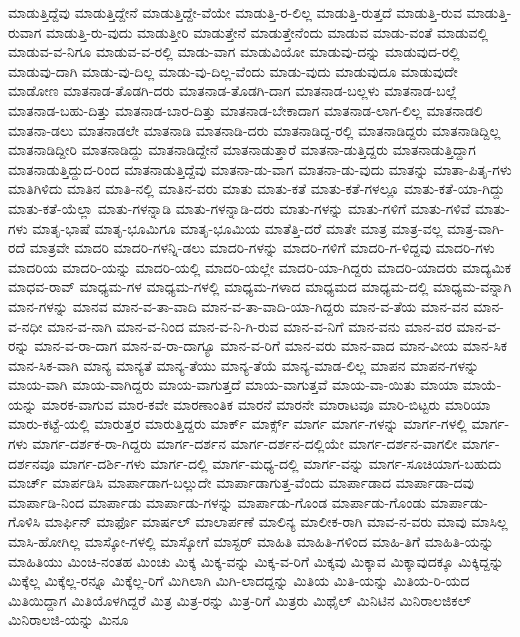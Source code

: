 {ಮಾಡುತ್ತಿದ್ದೆವು
ಮಾಡುತ್ತಿದ್ದೇನೆ
ಮಾಡುತ್ತಿದ್ದೇ-ವೆಯೇ
ಮಾಡುತ್ತಿ-ರ-ಲಿಲ್ಲ
ಮಾಡುತ್ತಿ-ರುತ್ತದೆ
ಮಾಡುತ್ತಿ-ರುವ
ಮಾಡುತ್ತಿ-ರುವಾಗ
ಮಾಡುತ್ತಿ-ರು-ವುದು
ಮಾಡುತ್ತೀರಿ
ಮಾಡುತ್ತೇನೆ
ಮಾಡುತ್ತೇನೆಂದು
ಮಾಡುವ
ಮಾಡು-ವಂತೆ
ಮಾಡುವಲ್ಲಿ
ಮಾಡುವ-ವ-ನಿಗೂ
ಮಾಡುವ-ವ-ರಲ್ಲಿ
ಮಾಡು-ವಾಗ
ಮಾಡುವಿಯೋ
ಮಾಡುವು-ದನ್ನು
ಮಾಡುವುದ-ರಲ್ಲಿ
ಮಾಡುವು-ದಾಗಿ
ಮಾಡು-ವು-ದಿಲ್ಲ
ಮಾಡು-ವು-ದಿಲ್ಲ-ವೆಂದು
ಮಾಡು-ವುದು
ಮಾಡುವುದೂ
ಮಾಡುವುದೇ
ಮಾಡೋಣ
ಮಾತನಾಡ-ತೊಡಗಿ-ದರು
ಮಾತನಾಡ-ತೊಡಗಿ-ದಾಗ
ಮಾತನಾಡ-ಬಲ್ಲಳು
ಮಾತನಾಡ-ಬಲ್ಲೆ
ಮಾತನಾಡ-ಬಹು-ದಿತ್ತು
ಮಾತನಾಡ-ಬಾರ-ದಿತ್ತು
ಮಾತನಾಡ-ಬೇಕಾದಾಗ
ಮಾತನಾಡ-ಲಾಗ-ಲಿಲ್ಲ
ಮಾತನಾಡಲಿ
ಮಾತನಾ-ಡಲು
ಮಾತನಾಡಲೇ
ಮಾತನಾಡಿ
ಮಾತನಾಡಿ-ದರು
ಮಾತನಾಡಿದ್ದ-ರಲ್ಲಿ
ಮಾತನಾಡಿದ್ದರು
ಮಾತನಾಡಿದ್ದಿಲ್ಲ
ಮಾತನಾಡಿದ್ದೀರಿ
ಮಾತನಾಡಿದ್ದು
ಮಾತನಾಡಿದ್ದೇನೆ
ಮಾತನಾಡುತ್ತಾರೆ
ಮಾತನಾ-ಡುತ್ತಿದ್ದರು
ಮಾತನಾಡುತ್ತಿದ್ದಾಗ
ಮಾತನಾಡುತ್ತಿದ್ದುದ-ರಿಂದ
ಮಾತನಾಡುತ್ತಿದ್ದೆವು
ಮಾತನಾ-ಡು-ವಾಗ
ಮಾತನಾ-ಡು-ವುದು
ಮಾತನ್ನು
ಮಾತಾ-ಪಿತೃ-ಗಳು
ಮಾತಿಗಿಳಿದು
ಮಾತಿನ
ಮಾತಿ-ನಲ್ಲಿ
ಮಾತಿನ-ವರು
ಮಾತು
ಮಾತು-ಕತೆ
ಮಾತು-ಕತೆ-ಗಳಲ್ಲೂ
ಮಾತು-ಕತೆ-ಯಾ-ಗಿದ್ದು
ಮಾತು-ಕತೆ-ಯೆಲ್ಲಾ
ಮಾತು-ಗಳನ್ನಾಡಿ
ಮಾತು-ಗಳನ್ನಾಡಿ-ದರು
ಮಾತು-ಗಳನ್ನು
ಮಾತು-ಗಳಿಗೆ
ಮಾತು-ಗಳಿವೆ
ಮಾತು-ಗಳು
ಮಾತೃ-ಭಾಷೆ
ಮಾತೃ-ಭೂಮಿಗೂ
ಮಾತೃ-ಭೂಮಿಯ
ಮಾತೆತ್ತಿ-ದರೆ
ಮಾತೇ
ಮಾತ್ರ
ಮಾತ್ರ-ವಲ್ಲ
ಮಾತ್ರ-ವಾಗಿ-ರದೆ
ಮಾತ್ರವೇ
ಮಾದರಿ
ಮಾದರಿ-ಗಳನ್ನಿ-ಡಲು
ಮಾದರಿ-ಗಳನ್ನು
ಮಾದರಿ-ಗಳಿಗೆ
ಮಾದರಿ-ಗ-ಳಿದ್ದವು
ಮಾದರಿ-ಗಳು
ಮಾದರಿಯ
ಮಾದರಿ-ಯನ್ನು
ಮಾದರಿ-ಯಲ್ಲಿ
ಮಾದರಿ-ಯಲ್ಲೇ
ಮಾದರಿ-ಯಾ-ಗಿದ್ದರು
ಮಾದರಿ-ಯಾದರು
ಮಾದ್ಯಮಿಕ
ಮಾಧವ-ರಾವ್
ಮಾಧ್ಯಮ-ಗಳ
ಮಾಧ್ಯಮ-ಗಳಲ್ಲಿ
ಮಾಧ್ಯಮ-ಗಳಾದ
ಮಾಧ್ಯಮದ
ಮಾಧ್ಯಮ-ದಲ್ಲಿ
ಮಾಧ್ಯಮ-ವನ್ನಾಗಿ
ಮಾನ-ಗಳನ್ನು
ಮಾನವ
ಮಾನ-ವ-ತಾ-ವಾದಿ
ಮಾನ-ವ-ತಾ-ವಾದಿ-ಯಾ-ಗಿದ್ದರು
ಮಾನ-ವ-ತೆಯ
ಮಾನ-ವನ
ಮಾನ-ವ-ನಧೀ
ಮಾನ-ವ-ನಾಗಿ
ಮಾನ-ವ-ನಿಂದ
ಮಾನ-ವ-ನಿ-ಗಿ-ರುವ
ಮಾನ-ವ-ನಿಗೆ
ಮಾನ-ವನು
ಮಾನ-ವರ
ಮಾನ-ವ-ರನ್ನು
ಮಾನ-ವ-ರಾ-ದಾಗ
ಮಾನ-ವ-ರಾ-ದಾಗ್ಯೂ
ಮಾನ-ವ-ರಿಗೆ
ಮಾನ-ವರು
ಮಾನ-ವಾದ
ಮಾನ-ವೀಯ
ಮಾನ-ಸಿಕ
ಮಾನ-ಸಿಕ-ವಾಗಿ
ಮಾನ್ಯ
ಮಾನ್ಯತೆ
ಮಾನ್ಯ-ತೆಯು
ಮಾನ್ಯ-ತೆಯೆ
ಮಾನ್ಯ-ಮಾಡ-ಲಿಲ್ಲ
ಮಾಪನ
ಮಾಪನ-ಗಳನ್ನು
ಮಾಯ-ವಾಗಿ
ಮಾಯ-ವಾಗಿದ್ದರು
ಮಾಯ-ವಾಗುತ್ತದೆ
ಮಾಯ-ವಾಗುತ್ತವೆ
ಮಾಯ-ವಾ-ಯಿತು
ಮಾಯಾ
ಮಾಯೆ-ಯನ್ನು
ಮಾರಕ-ವಾಗುವ
ಮಾರ-ಕವೇ
ಮಾರಣಾಂತಿಕ
ಮಾರನೆ
ಮಾರನೇ
ಮಾರಾಟವೂ
ಮಾರಿ-ಬಿಟ್ಟರು
ಮಾರಿಯಾ
ಮಾರು-ಕಟ್ಟೆ-ಯಲ್ಲಿ
ಮಾರುತ್ತರ
ಮಾರುತ್ತಿದ್ದರು
ಮಾರ್ಕ್
ಮಾರ್ಕ್ಸ್
ಮಾರ್ಗ
ಮಾರ್ಗ-ಗಳನ್ನು
ಮಾರ್ಗ-ಗಳಲ್ಲಿ
ಮಾರ್ಗ-ಗಳು
ಮಾರ್ಗ-ದರ್ಶಕ-ರಾ-ಗಿದ್ದರು
ಮಾರ್ಗ-ದರ್ಶನ
ಮಾರ್ಗ-ದರ್ಶನ-ದಲ್ಲಿಯೇ
ಮಾರ್ಗ-ದರ್ಶನ-ವಾಗಲೀ
ಮಾರ್ಗ-ದರ್ಶನವೂ
ಮಾರ್ಗ-ದರ್ಶಿ-ಗಳು
ಮಾರ್ಗ-ದಲ್ಲಿ
ಮಾರ್ಗ-ಮಧ್ಯ-ದಲ್ಲಿ
ಮಾರ್ಗ-ವನ್ನು
ಮಾರ್ಗ-ಸೂಚಿಯಾಗ-ಬಹುದು
ಮಾರ್ಚ್
ಮಾರ್ಪಡಿಸಿ
ಮಾರ್ಪಾಡಾಗ-ಬಲ್ಲುದೇ
ಮಾರ್ಪಾಡಾಗುತ್ತ-ವೆಂದು
ಮಾರ್ಪಾಡಾದ
ಮಾರ್ಪಾಡಾ-ದವು
ಮಾರ್ಪಾಡಿ-ನಿಂದ
ಮಾರ್ಪಾಡು
ಮಾರ್ಪಾಡು-ಗಳನ್ನು
ಮಾರ್ಪಾಡು-ಗೊಂಡ
ಮಾರ್ಪಾಡು-ಗೊಂಡು
ಮಾರ್ಪಾಡು-ಗೊಳಿಸಿ
ಮಾರ್ಫಿನ್
ಮಾರ್ಫೊ
ಮಾರ್ಷಲ್
ಮಾಲಾರ್ಪಣೆ
ಮಾಲಿನ್ಯ
ಮಾಲೀಕ-ರಾಗಿ
ಮಾವ-ನ-ವರು
ಮಾವು
ಮಾಸಿಲ್ಲ
ಮಾಸಿ-ಹೋಗಿಲ್ಲ
ಮಾಸ್ಕೋ-ಗಳಲ್ಲಿ
ಮಾಸ್ಕೋಗೆ
ಮಾಸ್ಟರ್
ಮಾಹಿತಿ
ಮಾಹಿತಿ-ಗಳಿಂದ
ಮಾಹಿ-ತಿಗೆ
ಮಾಹಿತಿ-ಯನ್ನು
ಮಾಹಿತಿಯು
ಮಿಂಚಿ-ನಂತಹ
ಮಿಂಚು
ಮಿಕ್ಕ
ಮಿಕ್ಕ-ವನ್ನು
ಮಿಕ್ಕ-ವ-ರಿಗೆ
ಮಿಕ್ಕವು
ಮಿಕ್ಕಾವ
ಮಿಕ್ಕಾವುದಕ್ಕೂ
ಮಿಕ್ಕಿದ್ದನ್ನು
ಮಿಕ್ಕೆಲ್ಲ
ಮಿಕ್ಕೆಲ್ಲ-ರನ್ನೂ
ಮಿಕ್ಕೆಲ್ಲ-ರಿಗೆ
ಮಿಗಿಲಾಗಿ
ಮಿಗಿ-ಲಾದದ್ದನ್ನು
ಮಿತಿಯ
ಮಿತಿ-ಯನ್ನು
ಮಿತಿಯ-ರಿ-ಯದ
ಮಿತಿಯಿದ್ದಾಗ
ಮಿತಿಯೊಳಗಿದ್ದರೆ
ಮಿತ್ರ
ಮಿತ್ರ-ರನ್ನು
ಮಿತ್ರ-ರಿಗೆ
ಮಿತ್ರರು
ಮಿಥೈಲ್
ಮಿನಿಟಿನ
ಮಿನಿರಾಲಜಿಕಲ್
ಮಿನಿರಾಲಜಿ-ಯನ್ನು
ಮಿನೂ
}
